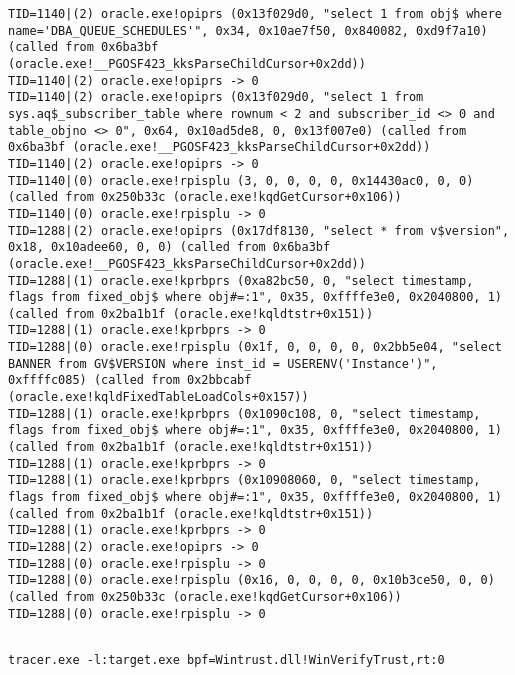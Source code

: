 \begin{lstlisting}
TID=1140|(2) oracle.exe!opiprs (0x13f029d0, "select 1 from obj$ where name='DBA_QUEUE_SCHEDULES'", 0x34, 0x10ae7f50, 0x840082, 0xd9f7a10) (called from 0x6ba3bf (oracle.exe!__PGOSF423_kksParseChildCursor+0x2dd))
TID=1140|(2) oracle.exe!opiprs -> 0
TID=1140|(2) oracle.exe!opiprs (0x13f029d0, "select 1 from sys.aq$_subscriber_table where rownum < 2 and subscriber_id <> 0 and table_objno <> 0", 0x64, 0x10ad5de8, 0, 0x13f007e0) (called from 0x6ba3bf (oracle.exe!__PGOSF423_kksParseChildCursor+0x2dd))
TID=1140|(2) oracle.exe!opiprs -> 0
TID=1140|(0) oracle.exe!rpisplu (3, 0, 0, 0, 0, 0x14430ac0, 0, 0) (called from 0x250b33c (oracle.exe!kqdGetCursor+0x106))
TID=1140|(0) oracle.exe!rpisplu -> 0
TID=1288|(2) oracle.exe!opiprs (0x17df8130, "select * from v$version", 0x18, 0x10adee60, 0, 0) (called from 0x6ba3bf (oracle.exe!__PGOSF423_kksParseChildCursor+0x2dd))
TID=1288|(1) oracle.exe!kprbprs (0xa82bc50, 0, "select timestamp, flags from fixed_obj$ where obj#=:1", 0x35, 0xffffe3e0, 0x2040800, 1) (called from 0x2ba1b1f (oracle.exe!kqldtstr+0x151))
TID=1288|(1) oracle.exe!kprbprs -> 0
TID=1288|(0) oracle.exe!rpisplu (0x1f, 0, 0, 0, 0, 0x2bb5e04, "select  BANNER from GV$VERSION where inst_id = USERENV('Instance')", 0xffffc085) (called from 0x2bbcabf (oracle.exe!kqldFixedTableLoadCols+0x157))
TID=1288|(1) oracle.exe!kprbprs (0x1090c108, 0, "select timestamp, flags from fixed_obj$ where obj#=:1", 0x35, 0xffffe3e0, 0x2040800, 1) (called from 0x2ba1b1f (oracle.exe!kqldtstr+0x151))
TID=1288|(1) oracle.exe!kprbprs -> 0
TID=1288|(1) oracle.exe!kprbprs (0x10908060, 0, "select timestamp, flags from fixed_obj$ where obj#=:1", 0x35, 0xffffe3e0, 0x2040800, 1) (called from 0x2ba1b1f (oracle.exe!kqldtstr+0x151))
TID=1288|(1) oracle.exe!kprbprs -> 0
TID=1288|(2) oracle.exe!opiprs -> 0
TID=1288|(0) oracle.exe!rpisplu -> 0
TID=1288|(0) oracle.exe!rpisplu (0x16, 0, 0, 0, 0, 0x10b3ce50, 0, 0) (called from 0x250b33c (oracle.exe!kqdGetCursor+0x106))
TID=1288|(0) oracle.exe!rpisplu -> 0
\end{lstlisting}

\subsection{}

\begin{lstlisting}
tracer.exe -l:target.exe bpf=Wintrust.dll!WinVerifyTrust,rt:0
\end{lstlisting}

